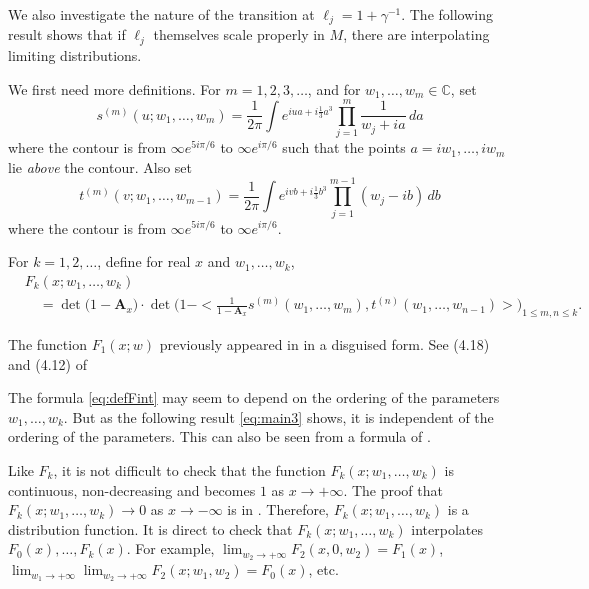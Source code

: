 \documentclass[11pt]{article}
\begin{document}
We also investigate the nature of the transition at
$\ell_j=1+\gamma^{-1}$. The following result shows that if $\ell_j$
themselves scale properly in $M$, there are interpolating limiting
distributions.

We first need more definitions. For $m=1,2,3,\dots$, and for
$w_1,\dots, w_m\in \mathbb{C}$, set
\begin{equation}
  s^{(m)}(u; w_1,\dots, w_m) = \frac1{2\pi}
  \int e^{iua+ i\frac13a^3} \prod_{j=1}^m \frac1{w_j+ia} \, da
\end{equation}
where the contour is from $\infty e^{5i\pi/6}$ to $\infty
e^{i\pi/6}$ such that the points $a=iw_1,\dots, iw_m$ lie
\emph{above} the contour. Also set
\begin{equation}
  t^{(m)}(v; w_1,\dots, w_{m-1}) = \frac1{2\pi} \int e^{ivb+ i\frac13 b^3}
  \prod_{j=1}^{m-1} (w_j-ib) \, db
\end{equation}
where the contour is from $\infty e^{5i\pi/6}$ to $\infty
e^{i\pi/6}$.

\begin{definition}\label{defn:Fkint}
For $k=1,2,\dots$, define for real $x$ and $w_1,\dots, w_k$,
\begin{equation}\label{eq:defFint}
\begin{split}
  & F_k(x;w_1,\dots, w_k) \\
  &\quad = \det \bigl(1-\mathbf{A}_x\bigr)
  \cdot \det\biggl( 1- <\frac1{1-\mathbf{A}_x} s^{(m)}(w_1,\dots, w_m),
  t^{(n)}(w_1,\dots, w_{n-1})> \biggr)_{1\le m,n\le k}.
\end{split}
\end{equation}
\end{definition}

The function $F_1(x;w)$ previously appeared in
\cite{ForresterRinterp} in a disguised form. See (4.18) and (4.12)
of \cite{ForresterRinterp}

The formula \eqref{eq:defFint} may seem to depend on the ordering
of the parameters $w_1,\dots, w_k$.
But as the following result \eqref{eq:main3} shows, it is
independent of the ordering of the parameters. This can also be seen
from a formula of \cite{Baik}.

Like $F_k$, it is not difficult to check that the function
$F_k(x;w_1,\dots, w_k)$ is continuous, non-decreasing and becomes
$1$ as $x\to +\infty$. The proof that $F_k(x;w_1,\dots, w_k) \to
0$ as $x\to -\infty$ is in \cite{Baik}. Therefore,
$F_k(x;w_1,\dots, w_k)$ is a distribution function. It is direct
to check that $F_k(x;w_1,\dots, w_k)$ interpolates $F_0(x), \dots,
F_k(x)$. For example, $\lim_{w_2\to +\infty} F_2(x, 0, w_2) =
F_1(x)$, $\lim_{w_1\to +\infty} \lim_{w_2\to +\infty}
F_2(x;w_1,w_2) = F_0(x)$, etc.
\end{document}
